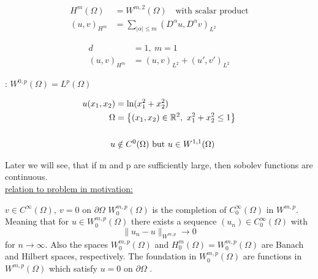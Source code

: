 \begin{align*}
	H^m(\Omega) &= W^{m,2}(\Omega) \quad \text{with scalar product}\\
	(u,v)_{H^m} &= \displaystyle \sum_{|\alpha| \leq m} (D^\alpha u, D^\alpha v)_{L^2}
\end{align*}

\begin{example}
	\begin{align*}
		d&=1,\ m=1\\
		(u,v)_{H^m} &= (u,v)_{L^2} + (u',v')_{L^2}
	\end{align*} 
\end{example}

 
\begin{remark}: $W^{0,p}(\Omega) = L^p(\Omega)$\\
\end{remark}

\begin{example}
	\begin{align*}
	u(x_1,x_2) &= \text{ln}(x^2_1 + x^2_2)\\
	\Omega &= \big \{  (x_1,x_2)\in\mathbb{R}^2,\ x^2_1 + x^2_2 \leq 1    \big \} \\
	& \\
	u &\notin C^0(\Omega) \text{ but } u \in W^{1,1}(\Omega)
	\end{align*}
\end{example}
 
Later we will see, that if m and p are sufficiently large, then sobolev functions are continuous.\\
 
\underline{relation to problem in motivation:}\\

%
%
%
%
%

\par
\glqq $v \in C^\infty(\Omega),\ v=0 \text{ on } \partial\Omega$ \grqq \enter
$W^{m,p}_0(\Omega)$ is the completion of $C^\infty_0(\Omega)$ in $ W^{m,p} $. Meaning that for $u \in W^{m,p}_0(\Omega)$ there exists a sequence $(u_n) \in C^\infty_0(\Omega)$ with 
\begin{equation*}
	\|u_n - u\|_{W^{m,p}} \to 0
\end{equation*}
for $n \to \infty$.\enter
Also the spaces $W^{m,p}_0(\Omega)$ and $H^m_0(\Omega) = W^{m,p}_0(\Omega)$ are Banach and Hilbert spaces, respectively. The foundation in $W^{m,p}_0(\Omega)$ are functions in $W^{m,p}(\Omega)$ which satisfy \glqq $u =0$ on $\partial \Omega$ \grqq. \enter 
\par

